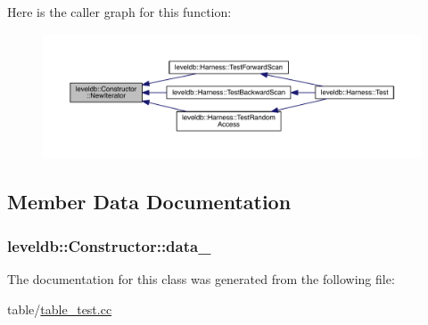 Here is the caller graph for this function\+:\nopagebreak
\begin{figure}[H]
\begin{center}
\leavevmode
\includegraphics[width=350pt]{classleveldb_1_1_constructor_a362b24b7194f605b655f5a136e0ae43c_icgraph}
\end{center}
\end{figure}




\subsection{Member Data Documentation}
\hypertarget{classleveldb_1_1_constructor_ab7a0cf797b5c3e45824162152b900c9d}{}
\subsubsection[{data\+\_\+}]{ leveldb\+::\+Constructor\+::data\+\_\+\hspace{0.3cm}{\ttfamily [private]}}\label{classleveldb_1_1_constructor_ab7a0cf797b5c3e45824162152b900c9d}


The documentation for this class was generated from the following file\+:\begin{DoxyCompactItemize}
\item 
table/\hyperlink{table__test_8cc}{table\+\_\+test.\+cc}\end{DoxyCompactItemize}

